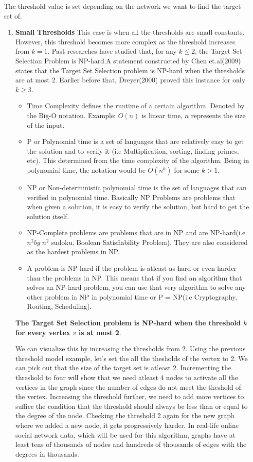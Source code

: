 The threshold value is set depending on the network we want to find the target set of.

\begin{enumerate}
	\item \textbf{Small Thresholds} This case is when all the thresholds are small constants. However, this threshold becomes more complex as the threshold increases from $k=1$. Past researches have studied that, for any $k \leq 2$, the Target Set Selection Problem is NP-hard.A statement constructed by Chen et.al(2009) states that the Target Set Selection problem is NP-hard when the thresholds are at most 2. Earlier before that, Dreyer(2000) proved this instance for only $k \geq 3$.\cite{dreyer} \cite{NPhardness} 
	\begin{itemize}
	\item Time Complexity defines the runtime of a certain algorithm. Denoted by the Big-O notation. Example: $O(n)$ is linear time, $n$ represents the size of the input.
	\item P or Polynomial time is a set of languages that are relatively easy to get the solution and to verify it (i.e Multiplication, sorting, finding primes, etc). This determined from the time complexity of the algorithm. Being in polynomial time, the notation would be $O(n^k)$ for some $k>1$.
	\item NP or Non-deterministic polynomial time is the set of languages that can verified in polynomial time. Basically NP Problems are problems that when given a solution, it is easy to verify the solution, but hard to get the solution itself.
	\item NP-Complete problems are problems that are in NP and are NP-hard(i.e $n^{2}by\; n^{2}$ sudoku, Boolean Satisfiability Problem). They are also considered as the hardest problems in NP.
	\item A problem is NP-hard if the problem is atleast as hard or even harder than the problems in NP. This means that if you find an algorithm that solves an NP-hard problem, you can use that very algorithm to solve any other problem in NP in polynomial time or P = NP(i.e Cryptography, Routing, Scheduling).  
\end{itemize} 
\textbf{The Target Set Selection problem is NP-hard when the threshold $k$ for every vertex $v$ is at most 2}. \cite{chen,dreyer}

We can visualize this by increasing the thresholds from 2. Using the previous threshold model example, let's set the all the thesholds of the vertex to 2. We can pick out that the size of the target set is atleast 2. Incrementing the threshold to four will show that we need atleast 4 nodes to activate all the vertices in the graph since the number of edges do not meet the theshold of the vertex. Increasing the threshold further, we need to add more vertices to suffice the condition that the threshold should always be less than or equal to the degree of the node. Checking the threshold 2 again for the new graph where we added a new node, it gets progressively harder. In real-life online social network data, which will be used for this algorithm, graphs have at least tens of thousands of nodes and hundreds of thousands of edges with the degrees in thousands.


\end{enumerate}
